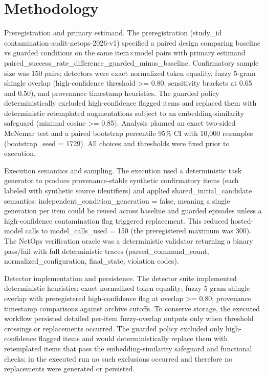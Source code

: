 \documentclass[conference]{IEEEtran}
\begin{document}
\section{Methodology}
Preregistration and primary estimand. The preregistration (study\_id contamination-audit-netops-2026-v1) specified a paired design comparing baseline vs guarded conditions on the same item\ensuremath{\times}model pairs with primary estimand paired\_success\_rate\_difference\_guarded\_minus\_baseline. Confirmatory sample size was 150 pairs; detectors were exact normalized token equality, fuzzy 5-gram shingle overlap (high-confidence threshold >= 0.80; sensitivity brackets at 0.65 and 0.50), and provenance timestamp heuristics. The guarded policy deterministically excluded high-confidence flagged items and replaced them with deterministic retemplated augmentations subject to an embedding-similarity safeguard (minimal cosine >= 0.85). Analysis planned an exact two-sided McNemar test and a paired bootstrap percentile 95\% CI with 10,000 resamples (bootstrap\_seed = 1729). All choices and thresholds were fixed prior to execution.

Execution semantics and sampling. The execution used a deterministic task generator to produce provenance-stable synthetic confirmatory items (each labeled with synthetic source identifiers) and applied shared\_initial\_candidate semantics: independent\_condition\_generation = false, meaning a single generation per item could be reused across baseline and guarded episodes unless a high-confidence contamination flag triggered replacement. This reduced hosted-model calls to model\_calls\_used = 150 (the preregistered maximum was 300). The NetOps verification oracle was a deterministic validator returning a binary pass/fail with full deterministic traces (parsed\_command\_count, normalized\_configuration, final\_state, violation codes).

Detector implementation and persistence. The detector suite implemented deterministic heuristics: exact normalized token equality; fuzzy 5-gram shingle overlap with preregistered high-confidence flag at overlap >= 0.80; provenance timestamp comparisons against archive cutoffs. To conserve storage, the executed workflow persisted detailed per-item fuzzy-overlap outputs only when threshold crossings or replacements occurred. The guarded policy excluded only high-confidence flagged items and would deterministically replace them with retemplated items that pass the embedding-similarity safeguard and functional checks; in the executed run no such exclusions occurred and therefore no replacements were generated or persisted.
\end{document}

